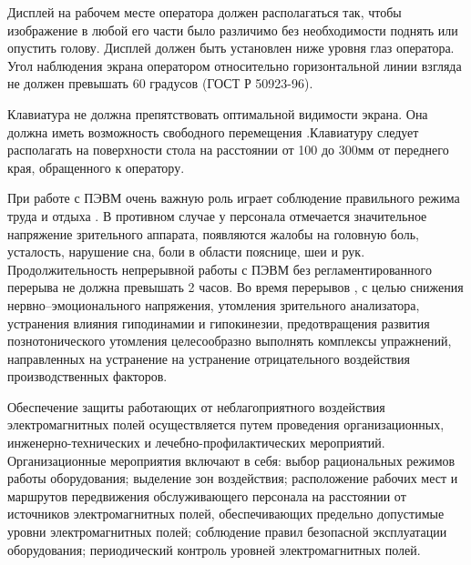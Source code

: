 Дисплей на рабочем месте оператора  должен располагаться так, чтобы 
изображение в любой его части было различимо без необходимости поднять
или опустить голову. Дисплей должен быть установлен ниже уровня глаз оператора.
Угол наблюдения экрана оператором относительно горизонтальной линии взгляда не должен
превышать 60 градусов (ГОСТ Р 50923-96).


Клавиатура не должна препятствовать оптимальной видимости экрана. Она 
должна иметь возможность свободного перемещения .Клавиатуру следует
располагать на поверхности стола на расстоянии  от 100 до 300мм  от переднего
края, обращенного к оператору.


При работе с ПЭВМ очень важную роль играет соблюдение правильного 
режима труда и отдыха . В противном случае у персонала отмечается значительное напряжение
зрительного аппарата, появляются жалобы на головную боль, усталость, нарушение сна, боли в
области пояснице, шеи и рук. Продолжительность непрерывной работы с ПЭВМ без регламентированного
перерыва не должна превышать 2 часов. Во время перерывов , с целью снижения нервно--эмоционального
напряжения, утомления зрительного анализатора, устранения влияния гиподинамии и гипокинезии,
предотвращения развития познотонического утомления целесообразно выполнять комплексы упражнений,
направленных на устранение на устранение отрицательного воздействия производственных факторов.


Обеспечение защиты работающих от неблагоприятного воздействия 
электромагнитных полей осуществляется путем проведения организационных,
инженерно-технических и лечебно-профилактических мероприятий.
Организационные мероприятия включают в себя: выбор рациональных режимов работы оборудования;
выделение зон воздействия; расположение рабочих мест и маршрутов передвижения обслуживающего
персонала на расстоянии от источников электромагнитных полей, обеспечивающих предельно допустимые
уровни электромагнитных полей; соблюдение правил безопасной эксплуатации оборудования;
периодический контроль уровней электромагнитных полей.


